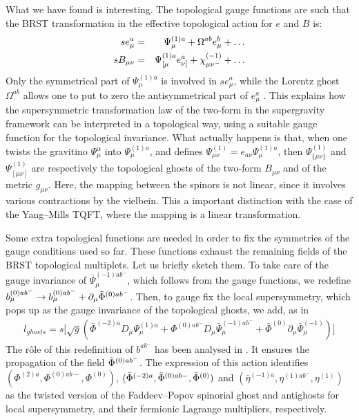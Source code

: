 \documentclass[a4paper,12pt]{article}
\def\L{l}
\let\pa=\partial
\begin{document}
What we have found is interesting. The topological gauge functions are
such   that the BRST transformation in the effective topological action
for $e$ and $B$ is:
\begin{eqnarray}
s e^a_\mu &=& \Psi^{(1)a}_\mu +\Omega ^{ab} e^b_\mu 
+\ldots
\cr s B_{\mu\nu} &=& \Psi^{(1)a}_{[\mu} e^a_{\nu]}+
{\chi}^{(-1)}_{\mu\nu^-}+
\ldots  
\end{eqnarray}
Only the symmetrical part of $\Psi ^{(1)a}_\mu$ is involved in
$se^a_\mu$, while the Lorentz ghost $\Omega ^{ab}$ allows one to put to
zero the antisymmetrical part of $ e^a_\mu$ .
This explains  how the supersymmetric transformation law of the two-form  
in the supergravity framework can  be interpreted in a topological
way, using a suitable gauge function for the topological invariance.
What actually happens is that, when one twists the gravitino
$\Psi^\alpha_\mu$ into $\Psi^{(1)a}_\mu$, and   defines 
$\Psi^{(1)}_{ \mu\nu}=  e_{a\nu} \Psi^{(1)a}_\mu  $, 
then $\Psi^{(1)}_{\{\mu\nu\}}$ and $\Psi^{(1)}_{[\mu\nu]}$ are respectively the
topological ghosts of the two-form $B_{\mu\nu}$
and of the metric $g_{\mu\nu}$. Here, the mapping between the spinors
is not linear, since it involves various contractions by the vielbein.
This a important distinction with the case of the Yang--Mills
TQFT, where the mapping is a linear transformation. 

Some extra topological functions are needed in order to fix the 
symmetries of the gauge conditions used so far. These functions
exhaust the remaining fields of the BRST
topological multiplets. Let us briefly sketch them.
To take care of the gauge invariance of $\bar \Psi_\mu ^{(-1)ab^-}$,
which follows from the gauge functions, we redefine $b^{(0)ab^-}_\mu \to
b^{(0)ab^-}_\mu +\partial _\mu \tilde \Phi ^{(0)ab^-}$.
Then, to  gauge fix the local supersymmetry, which
pops up as the gauge invariance of the topological ghosts,  we add, as in
\cite{BT1,BT2}
\begin{eqnarray}
\label{gfghost}
\L_{ghosts}=
s\Big[\sqrt{g}(\bar \Phi ^{(-2)a}   D_\mu   \Psi ^{{(1)a}  }_\mu+
{\Phi}^{(0)ab^-}  D_\mu   \bar \Psi ^{(-1)ab^-}_\mu
+\bar \Phi ^{(0) } \pa_\mu   \bar \Psi^{(-1) }_\mu)\Big]
\end{eqnarray}
The r\^ole of this redefinition of $b^{ab^-}$ has been
analysed in \cite{BT1, BT2}. It ensures the propagation of
the field $\tilde \Phi ^{(0)ab^-}$.
The expression of  this  action identifies    $(\Phi^{(2)a}, 
{\Phi}^{(0)ab -},\Phi^{(0)})$,
$(\bar \Phi^{(-2)a},  {\tilde \Phi}^{(0)ab -},\bar \Phi^{(0)})$ 
and $(\bar \eta^{(-1)a},   \eta^{(1)ab ^-} , \eta^{(1)})$ 
as the twisted version of the  Faddeev--Popov spinorial 
ghost and antighosts for local supersymmetry, and their fermionic   
Lagrange multipliers, respectively.
\end{document}
